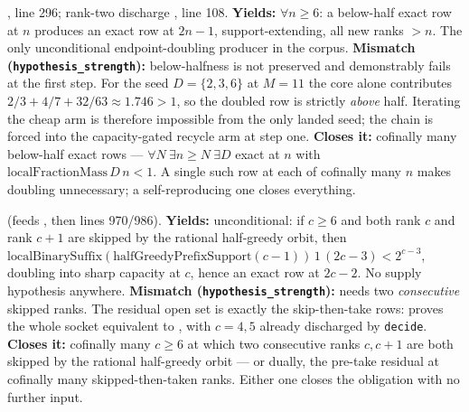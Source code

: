 \begin{obs} 
,
line 296; rank-two discharge
, line 108.
\textbf{Yields:} $\forall n \ge 6$: a below-half exact row at $n$ produces an exact row at
$2n{-}1$, support-extending, all new ranks $>n$. The only unconditional endpoint-doubling
producer in the corpus.
\textbf{Mismatch (\texttt{hypothesis\_strength}):} below-halfness is not preserved and
demonstrably fails at the first step. For the seed $D=\{2,3,6\}$ at $M=11$ the core alone
contributes $2/3+4/7+32/63 \approx 1.746 > 1$, so the doubled row is strictly \emph{above} half.
Iterating the cheap arm is therefore impossible from the only landed seed; the chain is forced
into the capacity-gated recycle arm at step one.
\textbf{Closes it:} cofinally many below-half exact rows — $\forall N\ \exists n \ge N\ \exists D$
exact at $n$ with $\mathrm{localFractionMass}\,D\,n < 1$. A single such row at each of cofinally
many $n$ makes doubling unnecessary; a self-reproducing one closes everything.
\end{obs}

\begin{obs} 
(feeds ,
then lines 970/986).
\textbf{Yields:} unconditional: if $c \ge 6$ and both rank $c$ and rank $c{+}1$ are skipped by
the rational half-greedy orbit, then $\mathrm{localBinarySuffix}(\mathrm{halfGreedyPrefixSupport}
(c{-}1))\,1\,(2c{-}3) < 2^{c-3}$, doubling into sharp capacity at $c$, hence an exact row at
$2c{-}2$. No supply hypothesis anywhere.
\textbf{Mismatch (\texttt{hypothesis\_strength}):} needs two \emph{consecutive} skipped ranks.
The residual open set is exactly the skip-then-take rows:
proves the whole socket equivalent to
,
with $c=4,5$ already discharged by \texttt{decide}.
\textbf{Closes it:} cofinally many $c \ge 6$ at which two consecutive ranks $c,c{+}1$ are both
skipped by the rational half-greedy orbit — or dually, the pre-take residual at cofinally many
skipped-then-taken ranks. Either one closes the obligation with no further input.
\end{obs}


